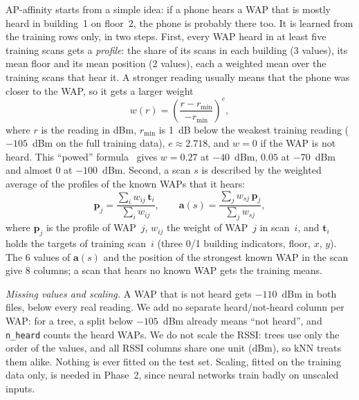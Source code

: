 AP-affinity starts from a simple idea: if a phone hears a WAP that is mostly
heard in building~1 on floor~2, the phone is probably there too. It is learned
from the training rows only, in two steps. First, every WAP heard in at least
five training scans gets a \emph{profile}: the share of its scans in each
building (3 values), its mean floor and its mean position (2 values), each a
weighted mean over the training scans that hear it. A stronger reading usually
means that the phone was closer to the WAP, so it gets a larger weight
\begin{equation}
  w(r)=\left(\frac{r-r_{\min}}{-r_{\min}}\right)^{e},
  \label{eq:weight}
\end{equation}
where $r$ is the reading in dBm, $r_{\min}$ is 1~dB below the weakest training
reading ($-105$~dBm on the full training data), $e\approx2.718$, and $w=0$ if
the WAP is not heard. This ``powed'' formula~\cite{torres2015comprehensive}
gives $w=0.27$ at $-40$~dBm, $0.05$ at $-70$~dBm and almost 0 at $-100$~dBm.
Second, a scan $s$ is described by the weighted average of the profiles of the
known WAPs that it hears:
\begin{equation}
  \mathbf{p}_j=\frac{\sum_i w_{ij}\,\mathbf{t}_i}{\sum_i w_{ij}},\qquad
  \mathbf{a}(s)=\frac{\sum_j w_{sj}\,\mathbf{p}_j}{\sum_j w_{sj}},
  \label{eq:affinity}
\end{equation}
where $\mathbf{p}_j$ is the profile of WAP~$j$, $w_{ij}$ the weight of WAP~$j$
in scan~$i$, and $\mathbf{t}_i$ holds the targets of training scan~$i$ (three
0/1 building indicators, floor, $x$, $y$). The 6 values of $\mathbf{a}(s)$ and
the position of the strongest known WAP in the scan give 8 columns; a scan
that hears no known WAP gets the training means.

\emph{Missing values and scaling.} A WAP that is not heard gets $-110$~dBm in
both files, below every real reading. We add no separate heard/not-heard
column per WAP: for a tree, a split below $-105$~dBm already means ``not
heard'', and \texttt{n\_heard} counts the heard WAPs. We do not scale the RSSI:
trees use only the order of the values, and all RSSI columns share one unit
(dBm), so kNN treats them alike. Nothing is ever fitted on the test set.
Scaling, fitted on the training data only, is needed in Phase~2, since neural
networks train badly on unscaled inputs.

